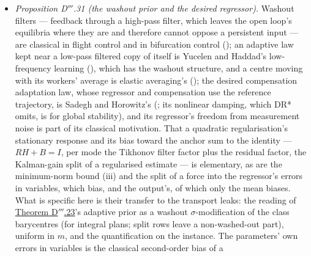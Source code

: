 \begin{itemize}
    disturbance (Anderson: the $H^{-1}$ response). What is specific here is their combination in the transport-leak
    setting: the floor's interpolation $(h_j + \eta)/(h_j + \eta + \sigma_0)$ in the prior's mobility (an elementary
    $2\times2$ Lyapunov computation), the driving matrix $Q = \langle(\dot{\hat J} + a\hat J)^\T(\dot{\hat J} + a\hat J)\rangle$
    of the sensitivity-filtered measurement the law sees (built on the derivative Gram of
    \hyperref[res:thmDppp:26]{Corollary D$'''$.26}'s filter correction), and the coherence of the $K_0$-atom
    identification with its noise threshold at the lift (invariance, not attraction; along the noisy trajectory the
    separations' drift grows with the developing errors-in-variables deviation, and the long-time threshold is open).
    Numerics: . Verdict: classical ingredients; a quantified structural statement for
    the transport leaks under noise.
  \item \emph{Proposition D$'''$.31 (the washout prior and the desired regressor).} Washout filters --- feedback
    through a high-pass filter, which leaves the open loop's equilibria where they are and therefore cannot oppose a
    persistent input --- are classical in flight control and in bifurcation control (\cite{S54}); an adaptive law
    kept near a low-pass filtered copy of itself is Yucelen and Haddad's low-frequency learning (\cite{S58}), which
    has the washout structure, and a centre moving with its workers' average is elastic averaging's (\cite{S49}); the
    desired compensation adaptation law, whose regressor and compensation use the reference trajectory, is Sadegh and
    Horowitz's (\cite{S53}; its nonlinear damping, which DR* omits, is for global stability), and its regressor's
    freedom from measurement noise is part of its classical motivation. That a quadratic regularisation's stationary
    response and its bias toward the anchor sum to the identity --- $RH + B = I$, per mode the Tikhonov filter factor
    plus the residual factor, the Kalman-gain split of a regularised estimate --- is elementary, as are the
    minimum-norm bound (iii) and the split of a force into the regressor's errors in variables, which bias, and the
    output's, of which only the mean biases. What is specific here is their transfer to the transport leaks: the
    reading of \hyperref[res:thmDppp:23]{Theorem D$'''$.23}'s adaptive prior as a washout $\sigma$-modification of
    the class barycentres (for integral plans; split rows leave a non-washed-out part), uniform in $m$, and the
    quantification on the instance. The parameters' own errors in variables is the classical second-order bias of a

\end{itemize}
